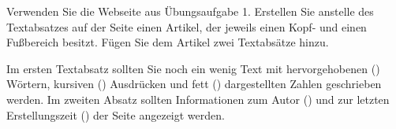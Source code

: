 %
\par Verwenden Sie die Webseite aus Übungsaufgabe 1. Erstellen Sie anstelle des
Textabsatzes auf der Seite einen Artikel, der jeweils einen Kopf- und einen
Fußbereich besitzt. Fügen Sie dem Artikel zwei Textabsätze hinzu.
%
\par Im ersten Textabsatz sollten Sie noch ein wenig Text mit hervorgehobenen
() Wörtern, kursiven () Ausdrücken und fett ()
dargestellten Zahlen geschrieben werden. Im zweiten Absatz sollten
Informationen zum Autor () und zur letzten Erstellungszeit
() der Seite angezeigt werden.